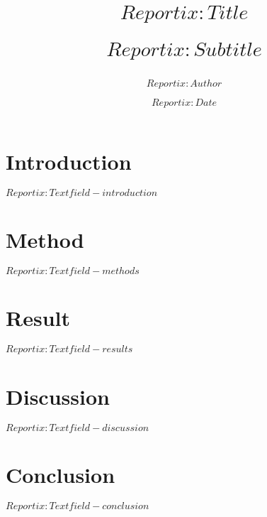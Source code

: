 \documentclass[12pt, a4paper, twocolumn]{article}
\title{
 $Reportix:Title$ \\
\begin{large}
  $Reportix:Subtitle$
\end{large} }
\author{$Reportix:Author$}
\date{$Reportix:Date$}
\begin{document}
\maketitle
\section*{Introduction}
$Reportix:Textfield-introduction$
\section*{Method}
$Reportix:Textfield-methods$
\section*{Result}
$Reportix:Textfield-results$
\section*{Discussion}
$Reportix:Textfield-discussion$
\section*{Conclusion}
$Reportix:Textfield-conclusion$
\end{document}
